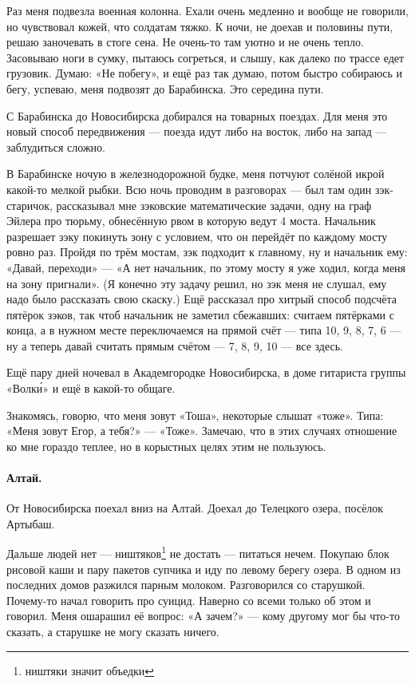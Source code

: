 \documentclass{book}
\begin{document}
Раз меня подвезла военная колонна.
Ехали очень медленно и
вообще не говорили, но чувствовал кожей, что солдатам тяжко.
К ночи, не доехав и половины пути, решаю заночевать в стоге сена.
Не очень-то там уютно и не очень тепло.
Засовываю ноги в сумку, пытаюсь согреться, и слышу, как далеко по трассе едет грузовик.
Думаю: «Не побегу», и ещё раз так думаю, потом быстро собираюсь и бегу, успеваю, меня подвозят до Барабинска.
Это середина пути.

С Барабинска до Новосибирска добирался на товарных поездах.
Для меня это новый способ передвижения --- поезда идут либо на восток, либо на запад --- заблудиться сложно.

В Барабинске ночую в железнодорожной будке, меня потчуют солёной икрой какой-то мелкой рыбки.
Всю ночь проводим в разговорах --- был там один зэк-старичок, рассказывал мне зэковские математические задачи, одну на граф Эйлера про тюрьму, обнесённую рвом в которую ведут 4 моста.
Начальник разрешает зэку покинуть зону с условием, что он перейдёт по каждому мосту ровно раз.
Пройдя по трём мостам, зэк подходит к главному, ну и начальник ему: «Давай, переходи» --- «А нет начальник, по этому мосту я уже ходил, когда меня на зону пригнали».
(Я конечно эту задачу решил, но зэк меня не слушал, ему надо было рассказать свою скаску.)
Ещё рассказал про хитрый способ подсчёта пятёрок зэков, так чтоб начальник не заметил сбежавших: считаем пятёрками с конца, а в нужном месте переключаемся на прямой счёт --- типа 10, 9, 8, 7, 6 --- ну а теперь давай считать прямым счётом --- 7, 8, 9, 10 --- все здесь.

Ещё пару дней ночевал в Академгородке Новосибирска,
в доме гитариста группы «Волк\'{и}» и ещё в какой-то общаге.

Знакомясь, говорю, что меня зовут «Тоша»,
некоторые слышат «тоже».
Типа: «Меня зовут Егор, а тебя?» --- «Тоже».
Замечаю, что в этих случаях отношение ко мне гораздо теплее,
но в корыстных целях этим не пользуюсь.

\paragraph{Алтай.}
От Новосибирска поехал вниз на Алтай.
Доехал до Телецкого озера, посёлок Артыбаш.

Дальше людей нет --- ништяков\footnote{ништяки значит объедки} не достать --- питаться нечем.
Покупаю блок рисовой каши и пару пакетов супчика и иду по левому берегу озера.
В одном из последних домов разжился парным молоком.
Разговорился со старушкой.
Почему-то начал говорить про суицид.
Наверно со всеми только об этом и говорил.
Меня ошарашил её вопрос: «А зачем?» --- кому другому мог бы что-то сказать, а старушке не могу сказать ничего.
\end{document}
